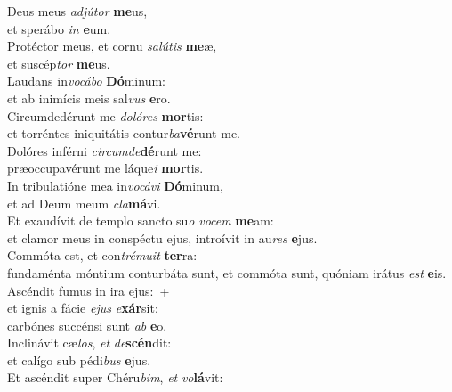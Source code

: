 \evenverse Deus meus \textit{ad}\textit{jú}\textit{tor} \textbf{me}us,~\*\\
\evenverse et sperábo \textit{in} \textbf{e}um.\\
\oddverse Protéctor meus, et cornu \textit{sa}\textit{lú}\textit{tis} \textbf{me}æ,~\*\\
\oddverse et suscép\textit{tor} \textbf{me}us.\\
\evenverse Laudans in\textit{vo}\textit{cá}\textit{bo} \textbf{Dó}minum:~\*\\
\evenverse et ab inimícis meis sal\textit{vus} \textbf{e}ro.\\
\oddverse Circumdedérunt me \textit{do}\textit{ló}\textit{res} \textbf{mor}tis:~\*\\
\oddverse et torréntes iniquitátis contur\textit{ba}\textbf{vé}runt me.\\
\evenverse Dolóres inférni \textit{cir}\textit{cum}\textit{de}\textbf{dé}runt me:~\*\\
\evenverse præoccupavérunt me láque\textit{i} \textbf{mor}tis.\\
\oddverse In tribulatióne mea in\textit{vo}\textit{cá}\textit{vi} \textbf{Dó}minum,~\*\\
\oddverse et ad Deum meum \textit{cla}\textbf{má}vi.\\
\evenverse Et exaudívit de templo sancto su\textit{o} \textit{vo}\textit{cem} \textbf{me}am:~\*\\
\evenverse et clamor meus in conspéctu ejus, introívit in au\textit{res} \textbf{e}jus.\\
\oddverse Commóta est, et con\textit{tré}\textit{mu}\textit{it} \textbf{ter}ra:~\*\\
\oddverse fundaménta móntium conturbáta sunt, et commóta sunt, quóniam irátus \textit{est} \textbf{e}is.\\
\evenverse Ascéndit fumus in ira ejus:~+\\
\evenverse  et ignis a fácie \textit{e}\textit{jus} \textit{e}\textbf{xár}sit:~\*\\
\evenverse carbónes succénsi sunt \textit{ab} \textbf{e}o.\\
\oddverse Inclinávit cæ\textit{los}, \textit{et} \textit{de}\textbf{scén}dit:~\*\\
\oddverse et calígo sub pédi\textit{bus} \textbf{e}jus.\\
\evenverse Et ascéndit super Chéru\textit{bim}, \textit{et} \textit{vo}\textbf{lá}vit:~\*\\

